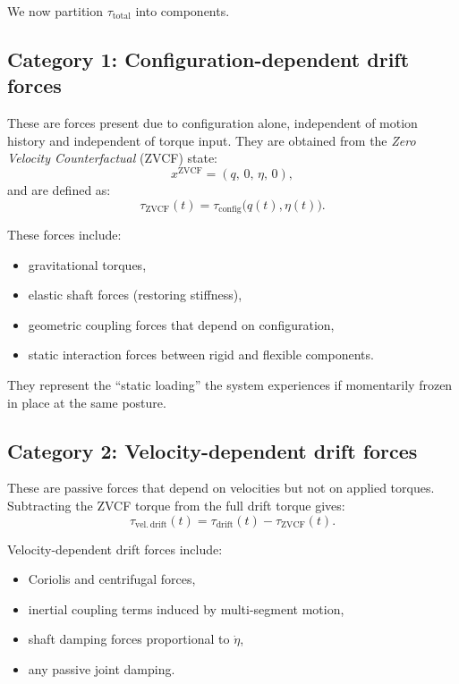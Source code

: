 \documentclass[12pt]{article}
\newcommand{\etad}{\dot{\eta}}
\begin{document}
We now partition \(\tau_{\text{total}}\) into components.

\subsection{Category 1: Configuration-dependent drift forces}

These are forces present due to configuration alone, independent of motion history and independent of torque input. They are obtained from the \emph{Zero Velocity Counterfactual} (ZVCF) state:
\[
  x^{\mathrm{ZVCF}} = (q,\, 0,\, \eta,\, 0),
\]
and are defined as:
\begin{equation}
  \tau_{\mathrm{ZVCF}}(t)
  =
  \tau_{\text{config}}\big(q(t),\eta(t)\big).
\end{equation}

These forces include:
\begin{itemize}
  \item gravitational torques,
  \item elastic shaft forces (restoring stiffness),
  \item geometric coupling forces that depend on configuration,
  \item static interaction forces between rigid and flexible components.
\end{itemize}

They represent the ``static loading'' the system experiences if momentarily frozen in place at the same posture.

\subsection{Category 2: Velocity-dependent drift forces}

These are passive forces that depend on velocities but not on applied torques. Subtracting the ZVCF torque from the full drift torque gives:
\begin{equation}
  \tau_{\mathrm{vel.\,drift}}(t)
  =
  \tau_{\text{drift}}(t) - \tau_{\mathrm{ZVCF}}(t).
  \label{eq:veldrift_def}
\end{equation}

Velocity-dependent drift forces include:
\begin{itemize}
  \item Coriolis and centrifugal forces,
  \item inertial coupling terms induced by multi-segment motion,
  \item shaft damping forces proportional to \(\etad\),
  \item any passive joint damping.
\end{itemize}
\end{document}
